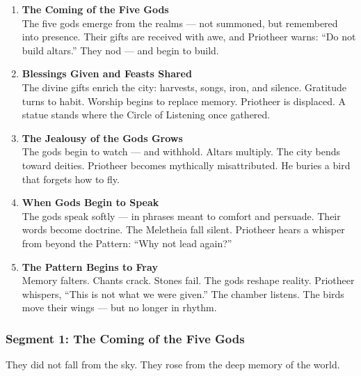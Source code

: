 \documentclass[9pt]{article}
\begin{document}
\begin{center}
\begin{enumerate}
    \item \textbf{The Coming of the Five Gods} \\
    The five gods emerge from the realms — not summoned, but remembered into presence. Their gifts are received with awe, and Priotheer warns: “Do not build altars.” They nod — and begin to build.

    \vspace{1in}
    \item \textbf{Blessings Given and Feasts Shared} \\
      The divine gifts enrich the city: harvests, songs, iron, and silence. Gratitude turns to habit. Worship begins to replace memory. Priotheer is displaced. A statue stands where the Circle of Listening once gathered.
    \vspace{1in}
    \item \textbf{The Jealousy of the Gods Grows} \\
     The gods begin to watch — and withhold. Altars multiply. The city bends toward deities. Priotheer becomes mythically misattributed. He buries a bird that forgets how to fly.
    \vspace{1in}
    \item \textbf{When Gods Begin to Speak} \\
    The gods speak softly — in phrases meant to comfort and persuade. Their words become doctrine. The Meletheia fall silent. Priotheer hears a whisper from beyond the Pattern: “Why not lead again?”
    \vspace{1in}
    \item \textbf{The Pattern Begins to Fray} \\
    Memory falters. Chants crack. Stones fail. The gods reshape reality. Priotheer whispers, “This is not what we were given.” The chamber listens. The birds move their wings — but no longer in rhythm.

\end{enumerate}
\end{center}

\newpage

\subsubsection*{Segment 1: The Coming of the Five Gods}

They did not fall from the sky.  
They rose from the deep memory of the world.
\end{document}
